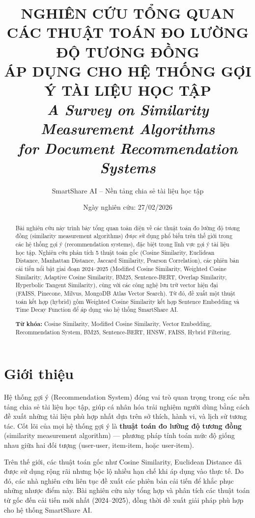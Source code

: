 \documentclass[12pt,a4paper]{article}
\title{
    \vspace{-1cm}
    \textbf{\Large NGHIÊN CỨU TỔNG QUAN CÁC THUẬT TOÁN ĐO LƯỜNG ĐỘ TƯƠNG ĐỒNG \\[0.3cm] ÁP DỤNG CHO HỆ THỐNG GỢI Ý TÀI LIỆU HỌC TẬP}
    \\[0.5cm]
    \large\textit{A Survey on Similarity Measurement Algorithms \\for Document Recommendation Systems}
}
\author{
    SmartShare AI -- Nền tảng chia sẻ tài liệu học tập
}
\date{Ngày nghiên cứu: 27/02/2026}
\begin{document}
\maketitle
\thispagestyle{fancy}

\begin{abstract}
\noindent
Bài nghiên cứu này trình bày tổng quan toàn diện về các thuật toán đo lường độ tương đồng (similarity measurement algorithms) được sử dụng phổ biến trên thế giới trong các hệ thống gợi ý (recommendation systems), đặc biệt trong lĩnh vực gợi ý tài liệu học tập. Nghiên cứu phân tích 5 thuật toán gốc (Cosine Similarity, Euclidean Distance, Manhattan Distance, Jaccard Similarity, Pearson Correlation), các phiên bản cải tiến nổi bật giai đoạn 2024--2025 (Modified Cosine Similarity, Weighted Cosine Similarity, Adaptive Cosine Similarity, BM25, Sentence-BERT, Overlap Similarity, Hyperbolic Tangent Similarity), cùng với các công nghệ lưu trữ vector hiện đại (FAISS, Pinecone, Milvus, MongoDB Atlas Vector Search). Từ đó, đề xuất một thuật toán kết hợp (hybrid) gồm Weighted Cosine Similarity kết hợp Sentence Embedding và Time Decay Function để áp dụng vào hệ thống SmartShare AI.

\vspace{0.3cm}
\noindent\textbf{Từ khóa:} Cosine Similarity, Modified Cosine Similarity, Vector Embedding, Recommendation System, BM25, Sentence-BERT, HNSW, FAISS, Hybrid Filtering.
\end{abstract}

\tableofcontents
\newpage

\section{Giới thiệu}

Hệ thống gợi ý (Recommendation System) đóng vai trò quan trọng trong các nền tảng chia sẻ tài liệu học tập, giúp cá nhân hóa trải nghiệm người dùng bằng cách đề xuất những tài liệu phù hợp nhất dựa trên sở thích, hành vi, và lịch sử tương tác. Cốt lõi của mọi hệ thống gợi ý là \textbf{thuật toán đo lường độ tương đồng} (similarity measurement algorithm) --- phương pháp tính toán mức độ giống nhau giữa hai đối tượng (user-user, item-item, hoặc user-item).

Trên thế giới, các thuật toán gốc như Cosine Similarity, Euclidean Distance đã được sử dụng rộng rãi nhưng bộc lộ nhiều hạn chế khi áp dụng vào thực tế. Do đó, các nhà nghiên cứu liên tục đề xuất các phiên bản cải tiến để khắc phục những nhược điểm này. Bài nghiên cứu này tổng hợp và phân tích các thuật toán từ gốc đến cải tiến mới nhất (2024--2025), đồng thời đề xuất giải pháp phù hợp cho hệ thống SmartShare AI.
\end{document}
